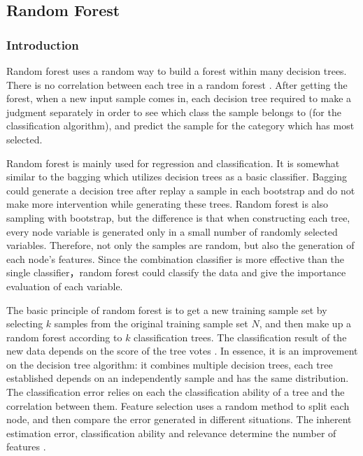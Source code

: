 \documentclass[sigconf]{acmart}
\begin{document}
\subsection{Random Forest}

\subsubsection{Introduction}

Random forest uses a random way to build a forest within many decision trees. There is no correlation between each tree in a random forest \cite{wiki.rf}. After getting the forest, when a new input sample comes in, each decision tree required to make a judgment separately in order to see which class the sample belongs to (for the classification algorithm), and predict the sample for the category which has most selected.

Random forest is mainly used for regression and classification. It is somewhat similar to the bagging which utilizes decision trees as a basic classifier. Bagging could generate a decision tree after replay a sample in each bootstrap and do not make more intervention while generating these trees. Random forest is also sampling with bootstrap, but the difference is that when constructing each tree, every node variable is generated only in a small number of randomly selected variables. Therefore, not only the samples are random, but also the generation of each node's features. Since the combination classifier is more effective than the single classifier，random forest could classify the data and give the importance evaluation of each variable.

The basic principle of random forest is to get a new training sample set by selecting $k$ samples from the original training sample set $N$, and then make up a random forest according to $k$ classification trees. The classification result of the new data depends on the score of the tree votes \cite{sp.rfc}. In essence, it is an improvement on the decision tree algorithm: it combines multiple decision trees, each tree established depends on an independently sample and has the same distribution. The classification error relies on each the classification ability of a tree and the correlation between them. Feature selection uses a random method to split each node, and then compare the error generated in different situations. The inherent estimation error, classification ability and relevance determine the number of features \cite{sp.rfc}.
\end{document}
